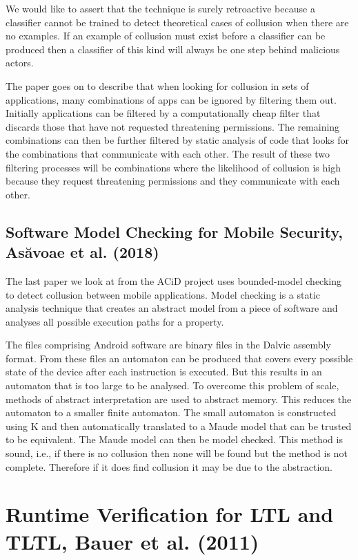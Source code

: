 We would like to assert that the technique is surely retroactive because a classifier cannot be trained to detect theoretical cases of collusion when there are no examples.  If an example of collusion must exist before a classifier can be produced then a classifier of this kind will always be one step behind malicious actors.

The paper goes on to describe that when looking for collusion in sets of applications, many combinations of apps can be ignored by filtering them out.  Initially applications can be filtered by a computationally cheap filter that discards those that have not requested threatening permissions.  The remaining combinations can then be further filtered by static analysis of code that looks for the combinations that communicate with each other.  The result of these two filtering processes will be combinations where the likelihood of collusion is high because they request threatening permissions and they communicate with each other.

\subsection{Software Model Checking for Mobile Security, As{\u a}voae et al. (2018) \cite{ModelCheckingCollusion}}

The last paper we look at from the ACiD project uses bounded-model checking to detect collusion between mobile applications.  Model checking is a static analysis technique that creates an abstract model from a piece of software and analyses all possible execution paths for a property.

The files comprising Android software are binary files in the Dalvic assembly format.  From these files an automaton can be produced that covers every possible state of the device after each instruction is executed.  But this results in an automaton that is too large to be analysed.  To overcome this problem of scale, methods of abstract interpretation are used to abstract memory.  This reduces the automaton to a smaller finite automaton.  The small automaton is constructed using K and then automatically translated to a Maude model that can be trusted to be equivalent.  The Maude model can then be model checked.  This method is sound, i.e., if there is no collusion then none will be found but the method is not complete.  Therefore if it does find collusion it may be due to the abstraction.

\section{Runtime Verification for LTL and TLTL, Bauer et al. (2011) \cite{RVForLTLAndTLTL}}

